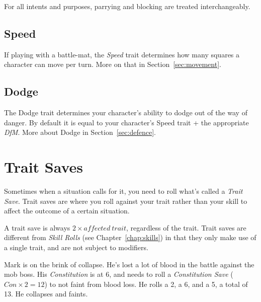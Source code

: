 \begin{note} 
    For all intents and purposes, parrying and blocking are treated interchangeably.
\end{note}

\subsection{Speed}
If playing with a battle-mat, the \textit{Speed} trait determines how many squares a character can move per turn.
More on that in Section~\ref{sec:movement}.

\subsection{Dodge}
The Dodge trait determines your character's ability to dodge out of the way of danger. 
By default it is equal to your character's Speed trait + the appropriate \textit{DfM}.
More about Dodge in Section~\ref{sec:defence}.

\section{Trait Saves}
Sometimes when a situation calls for it, you need to roll what's called a \textit{Trait Save}.
Trait saves are where you roll against your trait rather than your skill to affect the outcome of a certain situation.

A trait save is always $2 \times \mathit{affected\ trait}$, regardless of the trait.
Trait saves are different from \textit{Skill Rolls} (see Chapter~\ref{chap:skills}) in that they only make use of a single trait, and are not subject to modifiers.

\begin{example} 
    Mark is on the brink of collapse.
    He's lost a lot of blood in the battle against the mob boss.
    His \textit{Constitution} is at 6, and needs to roll a \textit{Constitution Save} ($Con \times 2 = 12$) to not faint from blood loss.
    He rolls a 2, a 6, and a 5, a total of 13. He collapses and faints.
\end{example}
